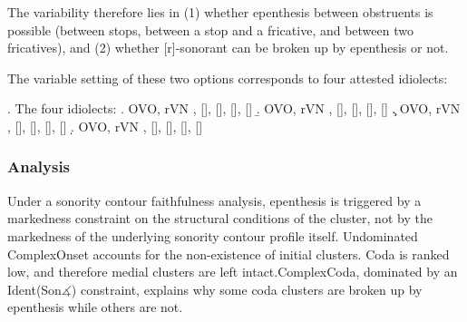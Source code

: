 \documentclass[12pt]{article}
\newcommand{\tickYes}{\checkmark}
\newcommand{\tickNo}{\hspace{1pt}\ding{55}}
\begin{document}
\bigskip

The variability therefore lies in (1) whether epenthesis between obstruents is possible (between stops, between a stop and a fricative, and between two fricatives), and (2) whether [r]-sonorant can be broken up by epenthesis or not.

The variable setting of these two options corresponds to four attested idiolects:

  \ex. \label{idiolects} The four idiolects: \citep[(43)]{rose.2000}
       \a. \label{idiolecta} \tickYes OVO, \tickNo rVN \citep{leslau.1964} \newline %
           [\textipa{k1rm}], [], [], [], []
       \b. \label{idiolectb} \tickYes OVO, \tickYes rVN \newline %
           [\textipa{k1r1m}], [], [], [], []
       \c. \label{idiolectc} \tickNo OVO, \tickNo rVN \newline %
           [\textipa{k1rm}], [], [], [], []
       \d. \label{idiolectd} \tickNo OVO, \tickYes rVN \newline %
           [\textipa{k1r1m}], [], [], [], []


\subsubsection{Analysis}

Under a sonority contour faithfulness analysis, epenthesis is triggered by a markedness constraint on the structural conditions of the cluster, not by the markedness of the underlying sonority contour profile itself. Undominated {\sc *ComplexOnset} accounts for the non-existence of initial clusters. {\sc *Coda} is ranked low, and therefore medial clusters are left intact.{\sc *ComplexCoda}, dominated by an {\sc Ident(Son$\measuredangle$)} constraint, explains why some coda clusters are broken up by epenthesis while others are not.
\end{document}
